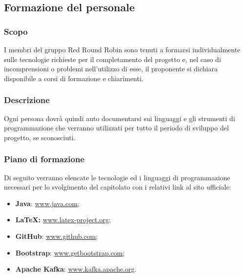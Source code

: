 \subsection{Formazione del personale}

	\subsubsection{Scopo}
		I membri del gruppo Red Round Robin sono tenuti a formarsi individualmente sulle tecnologie richieste per il completamento del progetto e, nel caso di incomprensioni o problemi nell'utilizzo di esse, il proponente si dichiara disponibile a corsi di formazione e chiarimenti.
		
	\subsubsection{Descrizione}
		Ogni persona dovrà quindi auto documentarsi sui linguaggi e gli strumenti di programmazione che verranno utilizzati per tutto il periodo di sviluppo del progetto, se sconosciuti.
		
	\subsubsection{Piano di formazione}
		Di seguito verranno elencate le tecnologie ed i linguaggi di programmazione necessari per lo svolgimento del capitolato con i relativi link al sito ufficiale:
		\begin{itemize}
			\item \textbf{Java}: \href{https://www.java.com/}{www.java.com};
			\item \textbf{\LaTeX{}:} \href{www.latex-project.org}{www.latex-project.org};
			\item \textbf{GitHub}: \href{www.github.com}{www.github.com};
			\item \textbf{Bootstrap}: \href{https://getbootstrap.com/}{www.getbootstrap.com};
			\item \textbf{Apache Kafka}: \href{https://kafka.apache.org/}{www.kafka.apache.org}.
		\end{itemize}

